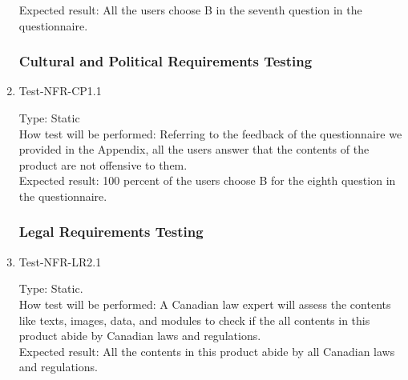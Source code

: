 \documentclass[12pt, titlepage]{article}
\begin{document}
\begin{enumerate}
Expected result: All the users choose B in the seventh question in the questionnaire.\\


\subsubsection{Cultural and Political Requirements Testing}

\item{Test-NFR-CP1.1\\}

Type: Static\\

How test will be performed: Referring to the feedback of the questionnaire we provided in the Appendix, all the users answer that the contents of the product are not offensive to them.\\

Expected result: 100 percent of the users choose B for the eighth question in the questionnaire.


\subsubsection{Legal Requirements Testing}

\item{Test-NFR-LR2.1\\}

Type: Static.\\

How test will be performed: A Canadian law expert will assess the contents like texts, images, data, and modules to check if the all contents in this product abide by Canadian laws and regulations.\\

Expected result: All the contents in this product abide by all Canadian laws and regulations.
\end{enumerate}
\end{document}
